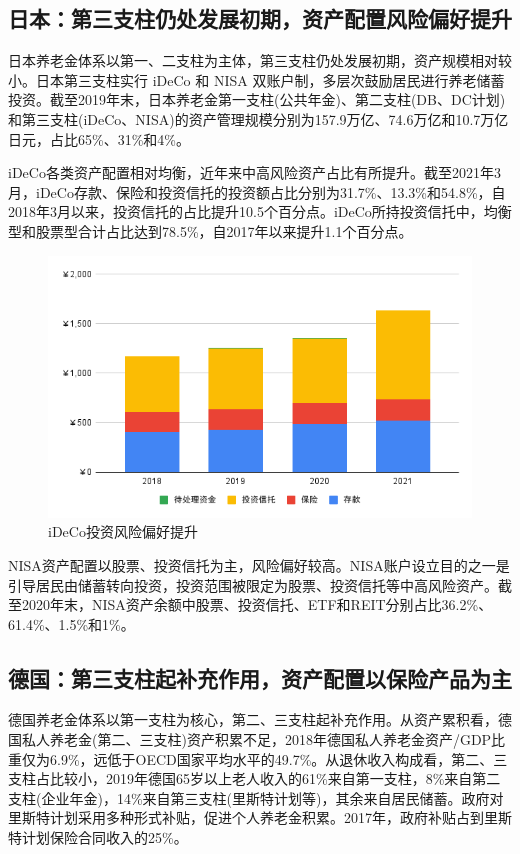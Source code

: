 \documentclass[a4paper,zihao=5]{ctexart}
\begin{document}
\subsection{日本：第三支柱仍处发展初期，资产配置风险偏好提升}
日本养老金体系以第一、二支柱为主体，第三支柱仍处发展初期，资产规模相对较小。日本第三支柱实行 iDeCo 和 NISA 双账户制，多层次鼓励居民进行养老储蓄投资。截至2019年末，日本养老金第一支柱(公共年金)、第二支柱(DB、DC计划)和第三支柱(iDeCo、NISA)的资产管理规模分别为157.9万亿、74.6万亿和10.7万亿日元，占比65\%、31\%和4\%。

iDeCo各类资产配置相对均衡，近年来中高风险资产占比有所提升。截至2021年3月，iDeCo存款、保险和投资信托的投资额占比分别为31.7\%、13.3\%和54.8\%，自2018年3月以来，投资信托的占比提升10.5个百分点。iDeCo所持投资信托中，均衡型和股票型合计占比达到78.5\%，自2017年以来提升1.1个百分点。
\begin{figure}[H]
    \centering
    \includegraphics[width=\linewidth]{img/iDeCo投资风险偏好提升.png}
    \caption{iDeCo投资风险偏好提升}
\end{figure}

NISA资产配置以股票、投资信托为主，风险偏好较高。NISA账户设立目的之一是引导居民由储蓄转向投资，投资范围被限定为股票、投资信托等中高风险资产。截至2020年末，NISA资产余额中股票、投资信托、ETF和REIT分别占比36.2\%、61.4\%、1.5\%和1\%。

\subsection{德国：第三支柱起补充作用，资产配置以保险产品为主}
德国养老金体系以第一支柱为核心，第二、三支柱起补充作用。从资产累积看，德国私人养老金(第二、三支柱)资产积累不足，2018年德国私人养老金资产/GDP比重仅为6.9\%，远低于OECD国家平均水平的49.7\%。从退休收入构成看，第二、三支柱占比较小，2019年德国65岁以上老人收入的61\%来自第一支柱，8\%来自第二支柱(企业年金)，14\%来自第三支柱(里斯特计划等)，其余来自居民储蓄。政府对里斯特计划采用多种形式补贴，促进个人养老金积累。2017年，政府补贴占到里斯特计划保险合同收入的25\%。
\end{document}
